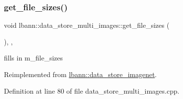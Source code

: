 \mbox{\label{classlbann_1_1data__store__multi__images_a25963dfa7d6de983e7b250f8ef7e2a0e}} 
\subsubsection{\texorpdfstring{get\+\_\+file\+\_\+sizes()}{get\_file\_sizes()}}
{\footnotesize\ttfamily void lbann\+::data\+\_\+store\+\_\+multi\+\_\+images\+::get\+\_\+file\+\_\+sizes (\begin{DoxyParamCaption}{ }\end{DoxyParamCaption})\hspace{0.3cm}{\ttfamily [override]}, {\ttfamily [protected]}, {\ttfamily [virtual]}}



fills in m\+\_\+file\+\_\+sizes 



Reimplemented from \hyperlink{classlbann_1_1data__store__imagenet_ae8f5d8741ddd762ffd3a477504bca619}{lbann\+::data\+\_\+store\+\_\+imagenet}.



Definition at line 80 of file data\+\_\+store\+\_\+multi\+\_\+images.\+cpp.


